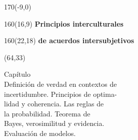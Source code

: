 \documentclass[shownotes,aspectratio=169]{beamer}
\newcounter{capitulo}
\newcommand{\unidad}{\thecapitulo \stepcounter{capitulo}}
\begin{document}
\begin{frame}
\begin{textblock}{170}(-9,0)
\end{textblock}

\begin{textblock}{160}(16,9)
\LARGE \textcolor{black!5}{\fontsize{22}{0}\selectfont \textbf{Principios interculturales}}
\end{textblock}
\begin{textblock}{160}(22,18)
\LARGE \textcolor{black!5}{\fontsize{22}{0}\selectfont \textbf{de acuerdos intersubjetivos}}
\end{textblock}


\begin{textblock}{55}(64,33)
\begin{turn}{33}
\parbox{6cm}{
\textcolor{black!5}{\hspace{-0.3cm}Capítulo \unidad} \\
\small\textcolor{black!5}{\hspace{-0.1cm}Definición de verdad en contextos de}\\
\small\textcolor{black!5}{\hspace{0.07cm}incertidumbre. Principios de optima-} \\
\small\textcolor{black!5}{\hspace{0.25cm}lidad y coherencia. Las reglas de} \\ \small\textcolor{black!5}{\hspace{0.4cm}la probabilidad. Teorema de} \\
\small\textcolor{black!5}{\hspace{0.36cm}Bayes, verosimilitud y evidencia.} \\
\small\textcolor{black!5}{\hspace{0.46cm}Evaluación de modelos.} \\
}
\end{turn}
\end{textblock}


\end{frame}
\end{document}
